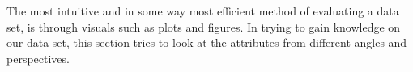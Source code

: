 The most intuitive and in some way most efficient method of evaluating a data set, is through visuals such as plots and figures. In trying to gain knowledge on our data set, this section tries to look at the attributes from different angles and perspectives.